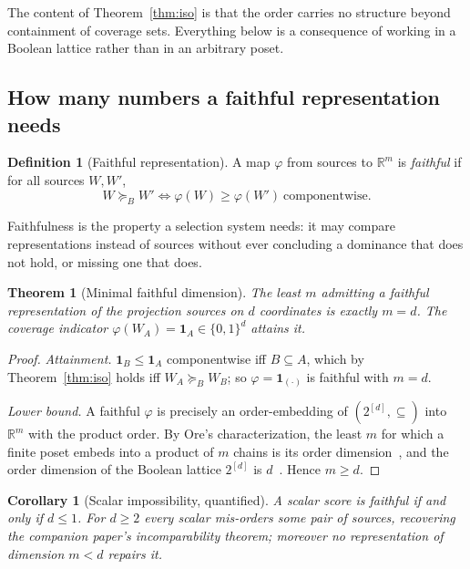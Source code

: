 \documentclass[11pt]{article}
\theoremstyle{plain}
\newtheorem{theorem}{Theorem}
\newtheorem{corollary}{Corollary}
\theoremstyle{definition}
\newtheorem{definition}{Definition}
\theoremstyle{remark}
\newcommand{\Bord}{\succeq_{B}}
\begin{document}
The content of Theorem~\ref{thm:iso} is that the order carries no structure beyond containment of
coverage sets. Everything below is a consequence of working in a Boolean lattice rather than in an
arbitrary poset.

\subsection{How many numbers a faithful representation needs}
\label{sec:dimension}

\begin{definition}[Faithful representation]\label{def:faithful}
A map $\varphi$ from sources to $\mathbb{R}^m$ is \emph{faithful} if for all sources $W,W'$,
\[
  W \Bord W' \iff \varphi(W) \ge \varphi(W') \ \text{componentwise.}
\]
\end{definition}

Faithfulness is the property a selection system needs: it may compare representations instead of
sources without ever concluding a dominance that does not hold, or missing one that does.

\begin{theorem}[Minimal faithful dimension]\label{thm:dimension}
The least $m$ admitting a faithful representation of the projection sources on $d$ coordinates is
exactly $m = d$. The coverage indicator $\varphi(W_A) = \mathbf{1}_A \in \{0,1\}^d$ attains it.
\end{theorem}

\begin{proof}
\emph{Attainment.} $\mathbf{1}_B \le \mathbf{1}_A$ componentwise iff $B \subseteq A$, which by
Theorem~\ref{thm:iso} holds iff $W_A \Bord W_B$; so $\varphi = \mathbf{1}_{(\cdot)}$ is faithful
with $m=d$.

\emph{Lower bound.} A faithful $\varphi$ is precisely an order-embedding of $(2^{[d]},\subseteq)$
into $\mathbb{R}^m$ with the product order. By Ore's characterization, the least $m$ for which a
finite poset embeds into a product of $m$ chains is its order dimension~\citep{trotter1992}, and
the order dimension of the Boolean lattice $2^{[d]}$ is $d$~\citep{dushnik1941}. Hence $m \ge d$.
\end{proof}

\begin{corollary}[Scalar impossibility, quantified]\label{cor:scalar}
A scalar score is faithful if and only if $d \le 1$. For $d \ge 2$ every scalar mis-orders some
pair of sources, recovering the companion paper's incomparability theorem; moreover no
representation of dimension $m < d$ repairs it.
\end{corollary}
\end{document}
